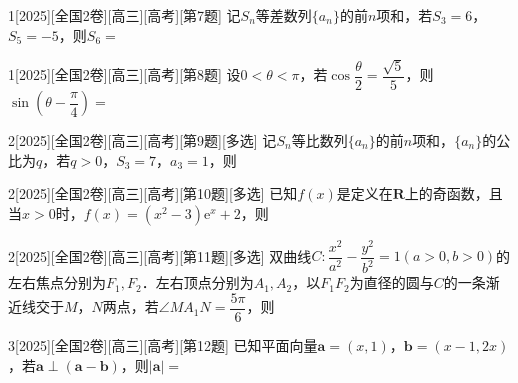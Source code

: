 \begin{example}{1}[2025][全国2卷][高三][高考][第7题]
记$S_n$等差数列$\{a_n\}$的前$n$项和，若$S_3=6$，$S_5=-5$，则$S_6=$\blankbox
\begin{choices}
\end{choices}
\end{example}

\begin{example}{1}[2025][全国2卷][高三][高考][第8题]
设$0<\theta<\pi$，若$\cos\dfrac{\theta}{2}=\dfrac{\sqrt{5}}{5}$，则$\sin\left(\theta-\dfrac{\pi}{4}\right)=$\blankbox
\begin{choices}
\end{choices}
\end{example}
\begin{example}{2}[2025][全国2卷][高三][高考][第9题][多选]
记$S_n$等比数列$\{a_n\}$的前$n$项和，$\{a_n\}$的公比为$q$，若$q>0$，$S_3=7$，$a_3=1$，则\blankbox
\begin{choices}
\end{choices}
\end{example}

\begin{example}{2}[2025][全国2卷][高三][高考][第10题][多选]
已知$f(x)$是定义在$\mathbf{R}$上的奇函数，且当$x>0$时，$f(x)=(x^2-3)\text{e}^x+2$，则\blankbox
\begin{choices}
\end{choices}
\end{example}

\begin{example}{2}[2025][全国2卷][高三][高考][第11题][多选]
双曲线$C:\dfrac{x^2}{a^2}-\dfrac{y^2}{b^2}=1(a>0,b>0)$的左右焦点分别为$F_1,F_2$．左右顶点分别为$A_1,A_2$，以$F_1F_2$为直径的圆与$C$的一条渐近线交于$M$，$N$两点，若$\angle MA_1N=\dfrac{5\pi}{6}$，则\blankbox
\begin{choices}
\end{choices}
\end{example}
\begin{example}{3}[2025][全国2卷][高三][高考][第12题]
已知平面向量$\boldsymbol{a}=(x,1)$，$\boldsymbol{b}=(x-1,2x)$，若$\boldsymbol{a}\perp(\boldsymbol{a}-\boldsymbol{b})$，则$|\boldsymbol{a}|=$\blankline
\end{example}

